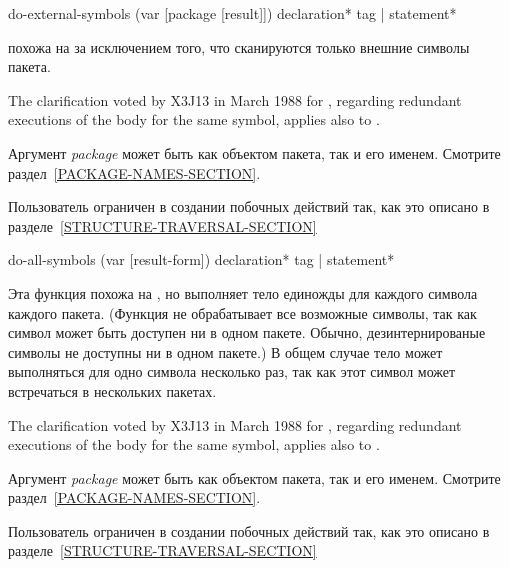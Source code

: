 \begin{defmac}
do-external-symbols (var [package [result]])
                    {declaration}* {tag | statement}*

 похожа на  за исключением того, что
сканируются только внешние символы пакета.

\begin{new}
The clarification voted by X3J13
in March 1988 for 
,
regarding redundant executions of the body for the same symbol,
applies also to .
\end{new}

Аргумент \emph{package} может быть как объектом пакета, так и его
именем. Смотрите раздел~\ref{PACKAGE-NAMES-SECTION}.

Пользователь ограничен в создании побочных действий так, как это описано в
разделе~\ref{STRUCTURE-TRAVERSAL-SECTION}
\end{defmac}

\begin{defmac}
do-all-symbols (var [result-form])
               {declaration}* {tag | statement}*

Эта функция похожа на , но выполняет тело единожды для каждого
символа каждого пакета. (Функция не обрабатывает все возможные символы, так как
символ может быть доступен ни в одном пакете. Обычно, дезинтернированые символы
не доступны ни в одном пакете.)
В общем случае тело может выполняться для одно символа несколько раз, так как
этот символ может встречаться в нескольких пакетах.

\begin{new}
The clarification voted by X3J13
in March 1988 for 
,
regarding redundant executions of the body for the same symbol,
applies also to .
\end{new}

Аргумент \emph{package} может быть как объектом пакета, так и его
именем. Смотрите раздел~\ref{PACKAGE-NAMES-SECTION}.

Пользователь ограничен в создании побочных действий так, как это описано в
разделе~\ref{STRUCTURE-TRAVERSAL-SECTION}
\end{defmac}

